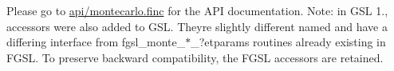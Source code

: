 Please go to \hyperlink{montecarlo_8finc}{api/montecarlo.\+finc} for the A\+P\+I documentation. Note\+: in G\+S\+L 1., accessors were also added to G\+S\+L. They\textquotesingle{}re slightly different named and have a differing interface from fgsl\+\_\+monte\+\_\+$\ast$\+\_\+?etparams routines already existing in F\+G\+S\+L. To preserve backward compatibility, the F\+G\+S\+L accessors are retained. 